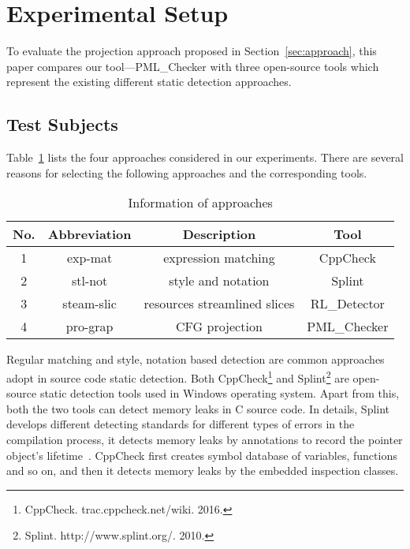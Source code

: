 \section{Experimental Setup}\label{sec:setup}
To evaluate the projection approach proposed in Section~\ref{sec:approach}, 
this paper compares our tool---PML\_Checker with three open-source tools which represent the existing different static detection approaches. 
\subsection{Test Subjects}\label{ssec:ts}
Table~\ref{tab:1} lists the four approaches considered in our experiments. There are several reasons for selecting the following approaches and the corresponding tools. 
%
\begin{table}[!h]
\center
\caption{Information of approaches}\label{tab:1}
\begin{tabular}{|c|c|c|c|}
\hline
\textbf{No.} & \textbf{Abbreviation} & \textbf{Description} & \textbf{Tool}\\
\hline
1 & exp-mat & expression matching & CppCheck\\
\hline
2 & stl-not & style and notation &	Splint\\
\hline
3 & steam-slic & resources streamlined slices & RL\_Detector\\
\hline
4 & pro-grap &	CFG projection &	PML\_Checker\\
\hline
\end{tabular}
\end{table}
%
Regular matching and style, notation based detection are common approaches adopt in source code static detection. Both CppCheck\footnote{CppCheck. trac.cppcheck.net/wiki. 2016.} and Splint\footnote{Splint. http://www.splint.org/. 2010.} are open-source static detection tools used in Windows operating system. Apart from this, both the two tools can detect memory leaks in C source code. In details, Splint develops different detecting standards for different types of errors in the compilation process, it detects memory leaks by annotations to record the pointer object’s lifetime~\cite{EL02}. CppCheck first creates symbol database of variables, functions and so on, and then it detects memory leaks by the embedded inspection classes.
 

